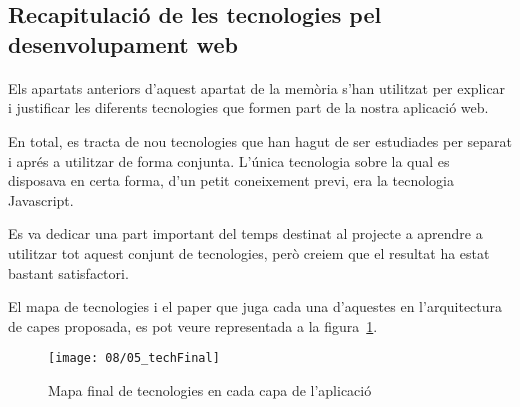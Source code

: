 \subsection{Recapitulació de les tecnologies pel desenvolupament web}

    \paragraph{}
    Els apartats anteriors d'aquest apartat de la memòria s'han utilitzat per explicar i justificar les diferents tecnologies que formen part de la nostra aplicació web.

    En total, es tracta de nou tecnologies que han hagut de ser estudiades per separat i aprés a utilitzar de forma conjunta. L'única tecnologia sobre la qual es disposava en certa forma, d'un petit coneixement previ, era la tecnologia Javascript.

    Es va dedicar una part important del temps destinat al projecte a aprendre a utilitzar tot aquest conjunt de tecnologies, però creiem que el resultat ha estat bastant satisfactori.

    El mapa de tecnologies i el paper que juga cada una d'aquestes en l'arquitectura de capes proposada, es pot veure representada a la figura~\ref{fig:finalTech}.

    \begin{figure}[h]
        \texttt{[image: 08/05\_techFinal]}
        \centering
        \caption{Mapa final de tecnologies en cada capa de l'aplicació}\label{fig:finalTech}
    \end{figure}
